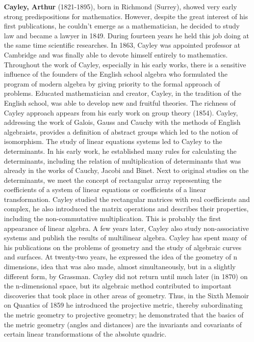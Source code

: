 \textbf{Cayley, Arthur }(1821-1895), born in Richmond (Surrey), showed very early strong predispositions for mathematics. However, despite the great interest of his first publications, he couldn't emerge as a mathematician, he decided to study law and became a lawyer in 1849. During fourteen years he held this job doing at the same time scientific researches. In 1863, Cayley was appointed professor at Cambridge and was finally able to devote himself entirely to mathematics. Throughout the work of Cayley, especially in his early works, there is a sensitive influence of the founders of the English school algebra who formulated the program of modern algebra by giving priority to the formal approach of problems. Educated mathematician and creator, Cayley, in the tradition of the English school, was able to develop new and fruitful theories. The richness of Cayley approach appears from his early work on group theory (1854). Cayley, addressing the work of Galois, Gauss and Cauchy with the methods of English algebraists, provides a definition of abstract groups which led to the notion of isomorphism. The study of linear equations systems led to Cayley to the determinants. In his early work, he established many rules for calculating the determinants, including the relation of multiplication of determinants that was already in the works of Cauchy, Jacobi and Binet. Next to original studies on the determinants, we meet the concept of rectangular array representing the coefficients of a system of linear equations or coefficients of a linear transformation. Cayley studied the rectangular matrices with real coefficients and complex, he also introduced the matrix operations and describes their properties, including the non-commutative multiplication. This is probably the first appearance of linear algebra. A few years later, Cayley also study non-associative systems and publish the results of multilinear algebra. Cayley has spent many of his publications on the problems of geometry and the study of algebraic curves and surfaces. At twenty-two years, he expressed the idea of the geometry of n dimensions, idea that was also made, almost simultaneously, but in a slightly different form, by Grassman. Cayley did not return until much later (in 1870) on the n-dimensional space, but its algebraic method contributed to important discoveries that took place in other areas of geometry. Thus, in the Sixth Memoir on Quantics of 1859 he introduced the projective metric, thereby subordinating the metric geometry to projective geometry; he demonstrated that the basics of the metric geometry (angles and distances) are the invariants and covariants of certain linear transformations of the absolute quadric.

